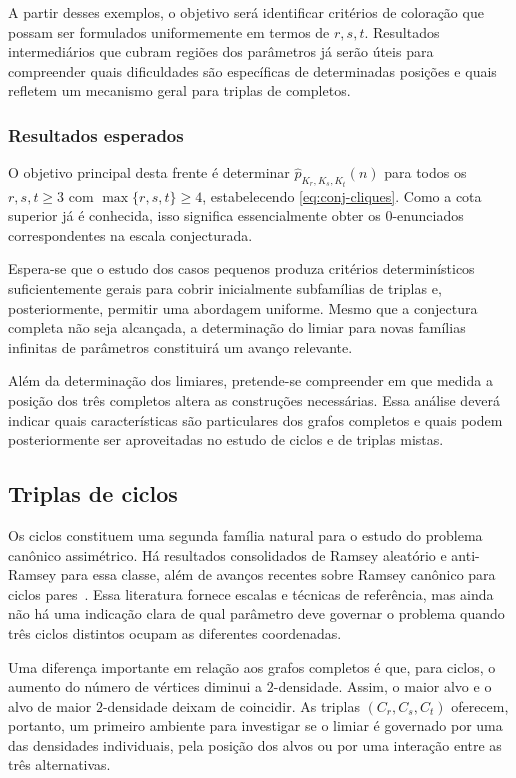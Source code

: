 \documentclass[11pt,a4paper]{article}
\theoremstyle{plain}
\theoremstyle{definition}
\begin{document}
A partir desses exemplos, o objetivo será identificar critérios de
coloração que possam ser formulados uniformemente em termos de
$r,s,t$. Resultados intermediários que cubram regiões dos parâmetros
já serão úteis para compreender quais dificuldades são específicas
de determinadas posições e quais refletem um mecanismo geral para
triplas de completos.

\subsubsection{Resultados esperados}

O objetivo principal desta frente é determinar
$\widehat p_{K_r,K_s,K_t}(n)$
para todos os $r,s,t\ge3$ com $\max\{r,s,t\}\ge4$, estabelecendo
\eqref{eq:conj-cliques}. Como a cota superior já é conhecida, isso
significa essencialmente obter os $0$-enunciados correspondentes na
escala conjecturada.

Espera-se que o estudo dos casos pequenos produza critérios
determinísticos suficientemente gerais para cobrir inicialmente
subfamílias de triplas e, posteriormente, permitir uma abordagem
uniforme. Mesmo que a conjectura completa não seja alcançada, a
determinação do limiar para novas famílias infinitas de parâmetros
constituirá um avanço relevante.

Além da determinação dos limiares, pretende-se compreender em que
medida a posição dos três completos altera as construções necessárias.
Essa análise deverá indicar quais características são particulares
dos grafos completos e quais podem posteriormente ser aproveitadas
no estudo de ciclos e de triplas mistas.


\subsection{Triplas de ciclos}
\label{sec:ciclos}


Os ciclos constituem uma segunda família natural para o estudo do
problema canônico assimétrico. Há resultados consolidados de Ramsey
aleatório e anti-Ramsey para essa classe, além de avanços recentes
sobre Ramsey canônico para ciclos pares~\cite{RR,BCMP,AKMM}. Essa
literatura fornece escalas e técnicas de referência, mas ainda não
há uma indicação clara de qual parâmetro deve governar o problema
quando três ciclos distintos ocupam as diferentes coordenadas.

Uma diferença importante em relação aos grafos completos é que, para
ciclos, o aumento do número de vértices diminui a $2$-densidade.
Assim, o maior alvo e o alvo de maior $2$-densidade deixam de
coincidir. As triplas
$(C_r,C_s,C_t)$
oferecem, portanto, um primeiro ambiente para investigar se o limiar
é governado por uma das densidades individuais, pela posição dos
alvos ou por uma interação entre as três alternativas.
\end{document}
